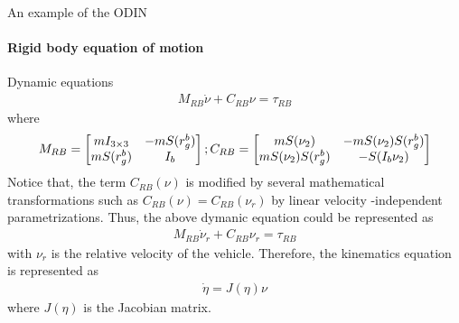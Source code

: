 



\begin{frame}{An example of the ODIN}
	\framesubtitle{Rigid body equation of motion}
	Dynamic equations
	\begin{align}
		M_{RB}\dot{\nu} + C_{RB}\nu = \tau_{RB}
	\end{align}
	where
	\begin{align}
		M_{RB} = \begin{bmatrix}
			mI_{3\times 3} & -mS(r_g^b) \\
			mS(r_g^b) & I_b
		\end{bmatrix}; C_{RB} = \begin{bmatrix}
			mS(\nu_2) & -mS(\nu_2)S(r_g^b) \\
			mS(\nu_2)S(r_g^b) & -S(I_b\nu_2)
		\end{bmatrix} \notag
	\end{align}
	Notice that, the term $C_{RB}(\nu)$ is modified by several mathematical transformations such as $C_{RB}(\nu) = C_{RB}(\nu_r)$ by linear velocity -independent parametrizations. Thus, the above dymanic equation could be represented as 
	\begin{align}
		M_{RB}\dot{\nu}_r + C_{RB}\nu_r = \tau_{RB}
	\end{align}
	with $\nu_r$ is the relative velocity of the vehicle. Therefore, the kinematics equation is represented as
	\begin{align}
		\dot{\eta} = J(\eta)\nu
	\end{align}
	where $J(\eta)$ is the Jacobian matrix.
\end{frame}







